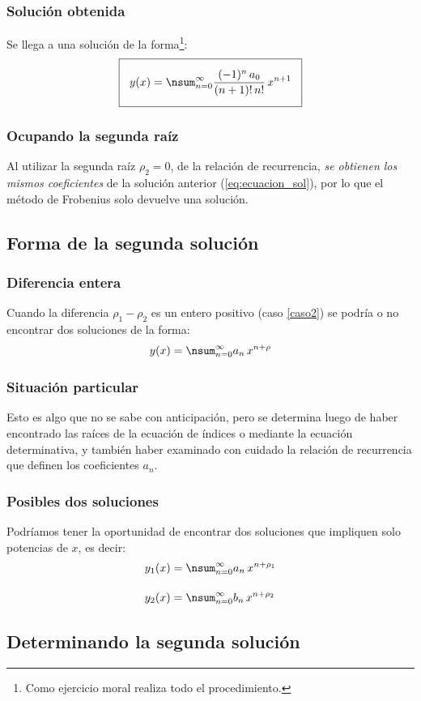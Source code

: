 \documentclass[12pt]{beamer}
\begin{document}
\begin{frame}
\frametitle{Solución obtenida}
Se llega a una solución de la forma\footnote{Como ejercicio moral realiza todo el procedimiento.}:
\pause
\begin{align}
\setlength{\fboxsep}{3\fboxsep}\boxed{
y(x) = \nsum_{n=0}^{\infty} \dfrac{(-1)^{n} \, a_{0}}{(n + 1)! \, n!} \, x^{n+1}}
\label{eq:ecuacion_sol}
\end{align}
\end{frame}
\begin{frame}
\frametitle{Ocupando la segunda raíz}
Al utilizar la segunda raíz $\rho_{2} = 0$, de la relación de recurrencia, \emph{se obtienen los mismos coeficientes} de la solución anterior (\ref{eq:ecuacion_sol}), por lo que el método de Frobenius solo devuelve una solución.
\end{frame}

\subsection{Forma de la segunda solución}

\begin{frame}
\frametitle{Diferencia entera}
Cuando la diferencia $\rho_{1} - \rho_{2}$ es un entero positivo (caso \ref{caso2}) se podría o no encontrar dos soluciones de la forma:
\pause
\begin{align*}
y(x) = \nsum_{n=0}^{\infty} a_{n} \, x^{n+\rho}
\end{align*}
\end{frame}
\begin{frame}
\frametitle{Situación particular}
Esto es algo que no se sabe con anticipación, pero se determina luego de haber encontrado las raíces de la ecuación de índices o mediante la ecuación determinativa, y también haber examinado con cuidado la relación de recurrencia que definen los coeficientes $a_{n}$.
\end{frame}
\begin{frame}
\frametitle{Posibles dos soluciones}
Podríamos tener la oportunidad de encontrar dos soluciones que impliquen solo potencias de $x$, es decir:
\begin{align*}
y_{1} (x) &= \nsum_{n=0}^{\infty} a_{n} \, x^{n+\rho_{1}} \\[1em]
y_{2} (x) &= \nsum_{n=0}^{\infty} b_{n} \, x^{n+\rho_{2}}
\end{align*}
\end{frame}

\subsection{Determinando la segunda solución}
\end{document}
